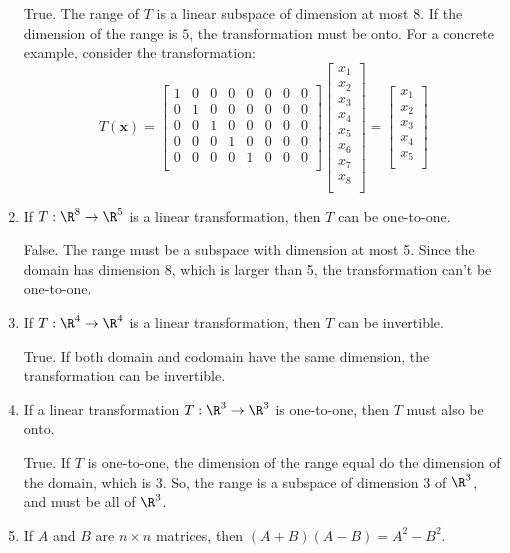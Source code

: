 \documentclass[12pt]{article}
\begin{document}
\begin{enumerate}
True. The range of $T$ is a linear subspace of dimension at most 8. If the dimension of the range is $5$, the transformation must be onto. For a concrete example, consider the transformation:
\[
T(\mathbf{x})=
\begin{bmatrix}
1&0&0&0&0&0&0&0\\
0&1&0&0&0&0&0&0\\
0&0&1&0&0&0&0&0\\
0&0&0&1&0&0&0&0\\
0&0&0&0&1&0&0&0\\
\end{bmatrix}
\begin{bmatrix}
x_1\\x_2\\x_3\\x_4\\x_5\\x_6\\x_7\\x_8\\
\end{bmatrix}=
\begin{bmatrix}
x_1\\x_2\\x_3\\x_4\\x_5\\
\end{bmatrix}
\]

\item If $T:\R^8\to\R^5$ is a linear transformation, then $T$ can be one-to-one.

False. The range must be a subspace with dimension at most 5. Since the domain has dimension 8, which is larger than 5, the transformation can't be one-to-one.

\item If $T:\R^4\to\R^4$ is a linear transformation, then $T$ can be invertible.

True. If both domain and codomain have the same dimension, the transformation can be invertible.

\item If a linear transformation $T:\R^3\to\R^3$ is one-to-one, then $T$ must also be onto.

True. If $T$ is one-to-one, the dimension of the range equal do the dimension of the domain, which is $3$. So, the range is a subspace of dimension 3 of $\R^3$, and must be all of $\R^3$.

\item If $A$ and $B$ are $n\times n$ matrices, then $(A+B)(A-B)=A^2-B^2$.


\end{enumerate}
\end{document}
